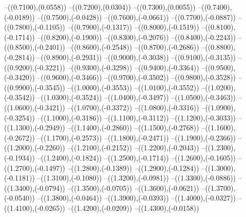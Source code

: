 {	--({\sx*(0.7100)},{\sy*(0.0558)})
	--({\sx*(0.7200)},{\sy*(0.0304)})
	--({\sx*(0.7300)},{\sy*(0.0055)})
	--({\sx*(0.7400)},{\sy*(-0.0189)})
	--({\sx*(0.7500)},{\sy*(-0.0428)})
	--({\sx*(0.7600)},{\sy*(-0.0661)})
	--({\sx*(0.7700)},{\sy*(-0.0887)})
	--({\sx*(0.7800)},{\sy*(-0.1105)})
	--({\sx*(0.7900)},{\sy*(-0.1317)})
	--({\sx*(0.8000)},{\sy*(-0.1519)})
	--({\sx*(0.8100)},{\sy*(-0.1714)})
	--({\sx*(0.8200)},{\sy*(-0.1900)})
	--({\sx*(0.8300)},{\sy*(-0.2076)})
	--({\sx*(0.8400)},{\sy*(-0.2243)})
	--({\sx*(0.8500)},{\sy*(-0.2401)})
	--({\sx*(0.8600)},{\sy*(-0.2548)})
	--({\sx*(0.8700)},{\sy*(-0.2686)})
	--({\sx*(0.8800)},{\sy*(-0.2814)})
	--({\sx*(0.8900)},{\sy*(-0.2931)})
	--({\sx*(0.9000)},{\sy*(-0.3038)})
	--({\sx*(0.9100)},{\sy*(-0.3135)})
	--({\sx*(0.9200)},{\sy*(-0.3221)})
	--({\sx*(0.9300)},{\sy*(-0.3298)})
	--({\sx*(0.9400)},{\sy*(-0.3364)})
	--({\sx*(0.9500)},{\sy*(-0.3420)})
	--({\sx*(0.9600)},{\sy*(-0.3466)})
	--({\sx*(0.9700)},{\sy*(-0.3502)})
	--({\sx*(0.9800)},{\sy*(-0.3528)})
	--({\sx*(0.9900)},{\sy*(-0.3545)})
	--({\sx*(1.0000)},{\sy*(-0.3553)})
	--({\sx*(1.0100)},{\sy*(-0.3552)})
	--({\sx*(1.0200)},{\sy*(-0.3542)})
	--({\sx*(1.0300)},{\sy*(-0.3524)})
	--({\sx*(1.0400)},{\sy*(-0.3497)})
	--({\sx*(1.0500)},{\sy*(-0.3463)})
	--({\sx*(1.0600)},{\sy*(-0.3421)})
	--({\sx*(1.0700)},{\sy*(-0.3372)})
	--({\sx*(1.0800)},{\sy*(-0.3316)})
	--({\sx*(1.0900)},{\sy*(-0.3254)})
	--({\sx*(1.1000)},{\sy*(-0.3186)})
	--({\sx*(1.1100)},{\sy*(-0.3112)})
	--({\sx*(1.1200)},{\sy*(-0.3033)})
	--({\sx*(1.1300)},{\sy*(-0.2949)})
	--({\sx*(1.1400)},{\sy*(-0.2860)})
	--({\sx*(1.1500)},{\sy*(-0.2768)})
	--({\sx*(1.1600)},{\sy*(-0.2672)})
	--({\sx*(1.1700)},{\sy*(-0.2573)})
	--({\sx*(1.1800)},{\sy*(-0.2471)})
	--({\sx*(1.1900)},{\sy*(-0.2366)})
	--({\sx*(1.2000)},{\sy*(-0.2260)})
	--({\sx*(1.2100)},{\sy*(-0.2152)})
	--({\sx*(1.2200)},{\sy*(-0.2043)})
	--({\sx*(1.2300)},{\sy*(-0.1934)})
	--({\sx*(1.2400)},{\sy*(-0.1824)})
	--({\sx*(1.2500)},{\sy*(-0.1714)})
	--({\sx*(1.2600)},{\sy*(-0.1605)})
	--({\sx*(1.2700)},{\sy*(-0.1497)})
	--({\sx*(1.2800)},{\sy*(-0.1389)})
	--({\sx*(1.2900)},{\sy*(-0.1284)})
	--({\sx*(1.3000)},{\sy*(-0.1181)})
	--({\sx*(1.3100)},{\sy*(-0.1080)})
	--({\sx*(1.3200)},{\sy*(-0.0981)})
	--({\sx*(1.3300)},{\sy*(-0.0886)})
	--({\sx*(1.3400)},{\sy*(-0.0794)})
	--({\sx*(1.3500)},{\sy*(-0.0705)})
	--({\sx*(1.3600)},{\sy*(-0.0621)})
	--({\sx*(1.3700)},{\sy*(-0.0540)})
	--({\sx*(1.3800)},{\sy*(-0.0464)})
	--({\sx*(1.3900)},{\sy*(-0.0393)})
	--({\sx*(1.4000)},{\sy*(-0.0327)})
	--({\sx*(1.4100)},{\sy*(-0.0265)})
	--({\sx*(1.4200)},{\sy*(-0.0209)})
	--({\sx*(1.4300)},{\sy*(-0.0158)})
}
